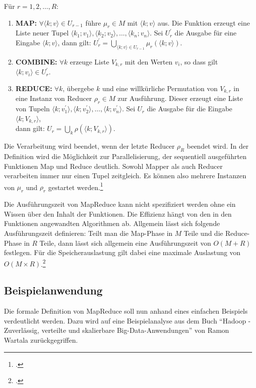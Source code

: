 Für $r = 1, 2, \dots, R$:

\begin{enumerate}
	\item \textbf{MAP:} $\forall \langle k; v \rangle \in U_{r-1}$ führe $\mu_r \in M$ mit $\langle k; v \rangle$ aus. Die Funktion erzeugt eine Liste neuer Tupel $\langle k_1; v_1 \rangle, \langle k_2; v_2 \rangle, \dots, \langle k_n; v_n \rangle$. Sei $U_r^{\prime}$ die Ausgabe für eine Eingabe $\langle k; v \rangle$, dann gilt: $U_r^{\prime} = \bigcup_{\langle k; v \rangle \in U_{r-1}} \mu_r(\langle k; v\rangle)$.
	\item \textbf{COMBINE:} $\forall k$ erzeuge Liste $V_{k,r}$ mit den Werten $v_i$, so dass gilt $\langle k; v_i \rangle \in U_r^{\prime}$.
	\item \textbf{REDUCE:} $\forall k$, übergebe $k$ und eine willkürliche Permutation von $V_{k,r}$ in eine Instanz von Reducer $\rho_r \in M$ zur Ausführung. Dieser erzeugt eine Liste von Tupeln $\langle k; v_1^{\prime} \rangle, \langle k; v_2^{\prime} \rangle, \dots, \langle k; v_n^{\prime} \rangle$. Sei $U_r$ die Ausgabe für die Eingabe $\langle k; V_{k,r} \rangle$, \\ dann gilt: $U_r = \bigcup_k \rho(\langle k; V_{k,r}\rangle)$.
\end{enumerate}

Die Verarbeitung wird beendet, wenn der letzte Reducer $\rho_R$ beendet wird. In der Definition wird die Möglichkeit zur Parallelisierung, der sequentiell ausgeführten Funktionen Map und Reduce deutlich. Sowohl Mapper als auch Reducer verarbeiten immer nur einen Tupel zeitgleich. Es können also mehrere Instanzen von $\mu_r$ und $\rho_r$ gestartet werden.\footcite[Vgl.][S. 2 f]{Karloff.2010}

Die Ausführungszeit von MapReduce kann nicht spezifiziert werden ohne ein Wissen über den Inhalt der Funktionen. Die Effizienz hängt von den in den Funktionen angewandten Algorithmen ab. Allgemein lässt sich folgende Ausführungszeit definieren: Teilt man die Map-Phase in $M$ Teile und die Reduce-Phase in $R$ Teile, dann lässt sich allgemein eine Ausführungszeit von $O(M+R)$ festlegen. Für die Speicherauslastung gilt dabei eine maximale Auslastung von $O(M \times R)$.\footcite[Vgl.][S. 5]{Dean.2004}

\subsection{Beispielanwendung}\label{subsec:Beispielanwendung}
Die formale Definition von MapReduce soll nun anhand eines einfachen Beispiels verdeutlicht werden. Dazu wird auf eine Beispielanalyse aus dem Buch "`Hadoop - Zuverlässig, verteilte und skalierbare Big-Data-Anwendungen"' von Ramon Wartala zurückgegriffen.

